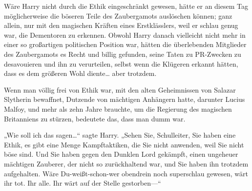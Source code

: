 Wäre Harry nicht durch die Ethik eingeschränkt gewesen, hätte er an diesem Tag möglicherweise die böseren Teile des Zaubergamots auslöschen können; ganz allein, nur mit den magischen Kräften eines Erstklässlers, weil er schlau genug war, die Dementoren zu erkennen. Obwohl Harry danach vielleicht nicht mehr in einer so großartigen politischen Position war, hätten die überlebenden Mitglieder des Zaubergamots es Recht und billig gefunden, seine Taten zu PR-Zwecken zu desavouieren und ihn zu verurteilen, selbst wenn die Klügeren erkannt hätten, dass es dem größeren Wohl diente… aber trotzdem.

Wenn man völlig frei von Ethik war, mit den alten Geheimnissen von Salazar Slytherin bewaffnet, Dutzende von mächtigen Anhängern hatte, darunter Lucius Malfoy, und mehr als zehn Jahre brauchte, um die Regierung des magischen Britanniens zu stürzen, bedeutete das, dass man dumm war.

„Wie soll ich das sagen…“ sagte Harry. „Sehen Sie, Schulleiter, Sie haben eine Ethik, es gibt eine Menge Kampftaktiken, die Sie nicht anwenden, weil Sie nicht böse sind. Und Sie haben gegen den Dunklen Lord gekämpft, einen ungeheuer mächtigen Zauberer, der nicht so zurückhaltend war, und Sie haben ihn trotzdem aufgehalten. Wäre Du-weißt-schon-wer obendrein noch superschlau gewesen, wärt ihr tot. Ihr alle. Ihr wärt auf der Stelle gestorben—“

